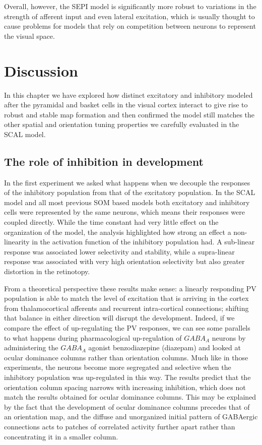 Overall, however, the SEPI model is significantly more robust to
variations in the strength of afferent input and even lateral
excitation, which is usually thought to cause problems for models
that rely on competition between neurons to represent the visual
space.

\section{Discussion}

In this chapter we have explored how distinct excitatory and
inhibitory modeled after the pyramidal and basket cells in the visual
cortex interact to give rise to robust and stable map formation and
then confirmed the model still matches the other spatial and
orientation tuning properties we carefully evaluated in the SCAL
model.

\subsection{The role of inhibition in development}

In the first experiment we asked what happens when we decouple the
responses of the inhibitory population from that of the excitatory
population. In the SCAL model and all most previous SOM based models
both excitatory and inhibitory cells were represented by the same
neurons, which means their responses were coupled directly. While the
time constant had very little effect on the organization of the model,
the analysis highlighted how strong an effect a non-linearity in the
activation function of the inhibitory population had. A sub-linear
response was associated lower selectivity and stability, while a
supra-linear response was associated with very high orientation
selectivity but also greater distortion in the retinotopy.

From a theoretical perspective these results make sense: a linearly
responding PV population is able to match the level of excitation that
is arriving in the cortex from thalamocortical afferents and recurrent
intra-cortical connections; shifting that balance in either direction
will disrupt the development. Indeed, if we compare the effect of
up-regulating the PV responses, we can see some parallels to what
happens during pharmacological up-regulation of $GABA_A$ neurons by
administering the $GABA_A$ agonist benzodiazepine (diazepam)
\citep{Fagiolini2004,Hensch2004} and looked at ocular dominance
columns rather than orientation columns. Much like in those
experiments, the neurons become more segregated and selective when the
inhibitory population was up-regulated in this way. The results
predict that the orientation column spacing narrows with increasing
inhibition, which does not match the results obtained for ocular
dominance columns. This may be explained by the fact that the
development of ocular dominance columns precedes that of an
orientation map, and the diffuse and unorganized initial pattern of
GABAergic connections acts to patches of correlated activity further
apart rather than concentrating it in a smaller column.

